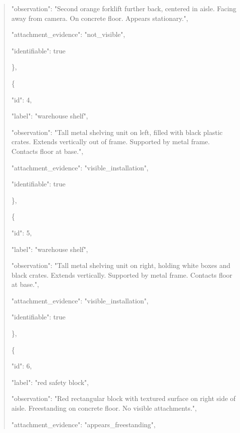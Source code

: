 \documentclass[10pt,a4paper]{article}
\begin{document}
\begin{quote}
      "observation":\allowbreak{} "Second orange forklift further back,\allowbreak{} centered in aisle. Facing away from camera. On concrete floor. Appears stationary.",\allowbreak{}\par
      "attachment\_evidence":\allowbreak{} "not\_visible",\allowbreak{}\par
      "identifiable":\allowbreak{} true\par
    \},\allowbreak{}\par
    \{\par
      "id":\allowbreak{} 4,\allowbreak{}\par
      "label":\allowbreak{} "warehouse shelf",\allowbreak{}\par
      "observation":\allowbreak{} "Tall metal shelving unit on left,\allowbreak{} filled with black plastic crates. Extends vertically out of frame. Supported by metal frame. Contacts floor at base.",\allowbreak{}\par
      "attachment\_evidence":\allowbreak{} "visible\_installation",\allowbreak{}\par
      "identifiable":\allowbreak{} true\par
    \},\allowbreak{}\par
    \{\par
      "id":\allowbreak{} 5,\allowbreak{}\par
      "label":\allowbreak{} "warehouse shelf",\allowbreak{}\par
      "observation":\allowbreak{} "Tall metal shelving unit on right,\allowbreak{} holding white boxes and black crates. Extends vertically. Supported by metal frame. Contacts floor at base.",\allowbreak{}\par
      "attachment\_evidence":\allowbreak{} "visible\_installation",\allowbreak{}\par
      "identifiable":\allowbreak{} true\par
    \},\allowbreak{}\par
    \{\par
      "id":\allowbreak{} 6,\allowbreak{}\par
      "label":\allowbreak{} "red safety block",\allowbreak{}\par
      "observation":\allowbreak{} "Red rectangular block with textured surface on right side of aisle. Freestanding on concrete floor. No visible attachments.",\allowbreak{}\par
      "attachment\_evidence":\allowbreak{} "appears\_freestanding",\allowbreak{}\par

\end{quote}
\end{document}
